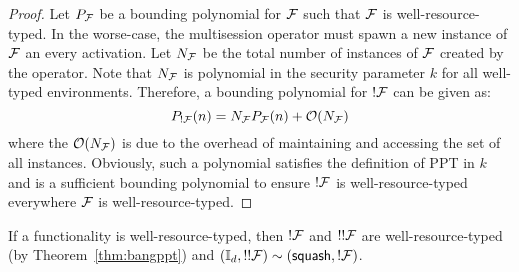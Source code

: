 \begin{proof}
Let $P_{\mathcal{F}}$ be a bounding polynomial for $\mathcal{F}$ such that $\mathcal{F}$ is well-resource-typed. 
In the worse-case, the multisession operator must spawn a new instance of $\mathcal{F}$ an every activation. 
Let $N_{\mathcal{F}}$ be the total number of instances of $\mathcal{F}$ created by the operator.
Note that $N_{\mathcal{F}}$ is polynomial in the security parameter $k$ for all well-typed environments.
Therefore, a bounding polynomial for $!\mathcal{F}$ can be given as:
$$ P_{!\mathcal{F}}(n) = N_{\mathcal{F}} P_{\mathcal{F}}(n) + \mathcal{O}(N_{\mathcal{F}}) $$
where the $\mathcal{O}(N_{\mathcal{F}})$ is due to the overhead of maintaining and accessing the set of all instances.
Obviously, such a polynomial satisfies the definition of PPT in $k$ and is a sufficient bounding polynomial to ensure $!\mathcal{F}$ is well-resource-typed everywhere $\mathcal{F}$ is well-resource-typed.
\end{proof}

\begin{theorem}
If a functionality \F is well-resource-typed, then $!\mathcal{F}$ and $!!\mathcal{F}$ are well-resource-typed (by Theorem~\ref{thm:bangppt}) and $(\mathbb{I}_d, !!\mathcal{F}) \sim ({\mathsf {squash}}, !\mathcal{F})$.
\end{theorem}


